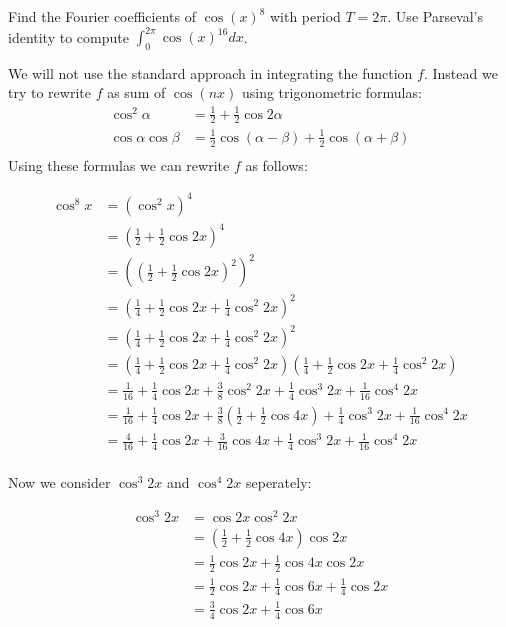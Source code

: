 \documentclass[11pt]{article}
\begin{document}
\begin{exercise}
    Find the Fourier coefficients of $\cos(x)^8$ with period $T = 2\pi$.
    Use Parseval's identity to compute $\int_0^{2\pi} \cos(x)^{16} dx$.
\end{exercise}
\begin{solution}     
We will not use the standard approach in integrating the function $f$. Instead we try to rewrite $f$ as sum of $\cos(nx)$ using trigonometric formulas:
\begin{align*}
\cos^2\alpha &= \frac 1 2 + \frac 1 2 \cos 2 \alpha\\
\cos\alpha\cos\beta &= \frac 1 2 \cos (\alpha-\beta)+ \frac 1 2 \cos (\alpha + \beta) \\
\end{align*}
Using these formulas we can rewrite $f$ as follows:

\begin{align*}
\cos^8x &= (\cos^2x)^4\\
&= (\frac 1 2 + \frac 1 2 \cos 2x)^4\\
&= ((\frac 1 2 + \frac 1 2 \cos 2x)^2)^2\\
&= (\frac 1 4 + \frac 1 2 \cos 2x + \frac 1 4 \cos ^2 2 x)^2\\
&= (\frac 1 4 + \frac 1 2 \cos 2x + \frac 1 4 \cos ^2 2 x)^2\\
&= (\frac 1 4 + \frac 1 2 \cos 2x + \frac 1 4 \cos ^2 2x)(\frac 1 4 + \frac 1 2 \cos 2x + \frac 1 4 \cos ^2 2x)\\
&= \frac{1}{16}+\frac 1 4 \cos 2x + \frac 3 8 \cos^2 2x + \frac 1 4 \cos^3 2x +\frac{1}{16} \cos^4 2x\\
&= \frac{1}{16}+\frac 1 4 \cos 2x + \frac 3 8 (\frac 1 2 + \frac 1 2 \cos 4x) + \frac 1 4 \cos^3 2x +\frac{1}{16} \cos^4 2x\\
&= \frac{4}{16}+\frac 1 4 \cos 2x + \frac{3}{16} \cos 4x + \frac 1 4 \cos^3 2x +\frac{1}{16} \cos^4 2x\\
\end{align*}

Now we consider $\cos^3 2x$ and $\cos^4 2x$ seperately:

\begin{align*}
\cos^3 2x &= \cos 2x \cos^2 2x\\
&= (\frac 1 2 + \frac 1 2 \cos 4x) \cos 2x\\
&= \frac 1 2 \cos 2x + \frac 1 2 \cos 4 x \cos 2 x \\
&= \frac 1 2 \cos 2x + \frac 1 4 \cos 6 x  + \frac 1 4 \cos 2 x \\
&= \frac 3 4 \cos 2x + \frac 1 4 \cos 6 x \\
\end{align*}


\end{solution}
\end{document}
